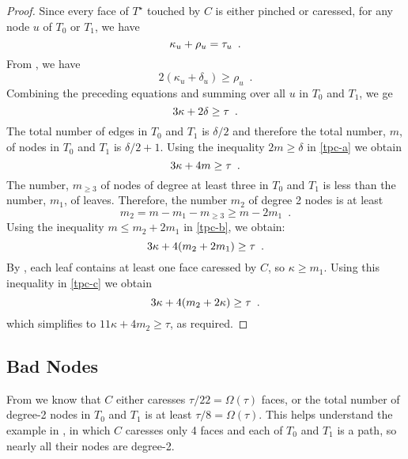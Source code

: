 \documentclass{patmorin}
\newcommand{\dual}[1]{{#1}^\star}
\begin{document}
\begin{proof}
  Since every face of $\dual{T}$ touched by $C$ is either pinched or
  caressed, for any node $u$ of $T_0$ or $T_1$, we have
  \begin{equation}
       \kappa_u + \rho_u = \tau_u \enspace . \eqlabel{tpc}
  \end{equation}
  From , we have 
  \[
      2(\kappa_u+\delta_u) \ge \rho_u \enspace .
  \]
  Combining the preceding equations and summing over all $u$ in $T_0$
  and $T_1$, we ge
  \begin{equation}
       3\kappa + 2\delta \ge \tau \enspace . \eqlabel{tpc-a}
  \end{equation}
  The total number of edges in $T_0$
  and $T_1$ is $\delta/2$ and therefore the total number, $m$,
  of nodes in $T_0$ and $T_1$ is $\delta/2+1$. Using the inequality
  $2m\ge \delta$ in \eqref{tpc-a} we obtain 
  \begin{equation}
       3\kappa + 4m \ge \tau \enspace .  \eqlabel{tpc-b}
  \end{equation}
  The number, $m_{\ge 3}$ of nodes of degree at least three in $T_0$
  and $T_1$ is less than the number, $m_1$, of leaves.  Therefore,
  the number $m_2$ of degree 2 nodes is at least
  \[
     m_2 = m - m_1 - m_{\ge 3} \ge m-2m_1 \enspace .
  \]
  Using the inequality $m\le m_2+2m_1$  in \eqref{tpc-b}, we obtain:
  \begin{equation}
       3\kappa + 4(m_2+2m_1) \ge \tau \enspace .  \eqlabel{tpc-c}
  \end{equation}
  By , each leaf contains at least one face caressed
  by $C$, so $\kappa \ge m_1$. Using this inequality in \eqref{tpc-c}
  we obtain
  \begin{equation}
       3\kappa + 4(m_2+2\kappa) \ge \tau \enspace .  \eqlabel{tpc-d}
  \end{equation}
  which simplifies to $11\kappa + 4m_2 \ge \tau$, as required.
\end{proof}

\subsection{Bad Nodes}

From  we know that $C$ either
caresses $\tau/22=\Omega(\tau)$ faces, or the total number of degree-2
nodes in $T_0$ and $T_1$ is at least $\tau/8=\Omega(\tau)$.  This helps
understand the example in , in which $C$ caresses
only 4 faces and each of $T_0$ and $T_1$ is a path, so nearly all their
nodes are degree-2.
\end{document}
